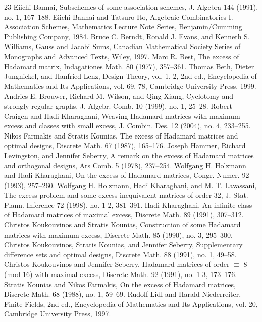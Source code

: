 \begin{thebibliography}{23}
 Eiichi Bannai, Subschemes of some association schemes, J. Algebra 144 (1991), no. 1, 167–188.
 Eiichi Bannai and Tatsuro Ito, Algebraic Combinatorics I. Association Schemes, Mathematics Lecture Note Series, Benjamin/Cumming Publishing Company, 1984.
 Bruce C. Berndt, Ronald J. Evans, and Kenneth S. Williams, Gauss and Jacobi Sums, Canadian Mathematical Society Series of Monographs and Advanced Texts, Wiley, 1997.
 Marc R. Best, The excess of Hadamard matrix, Indagationes Math. 80 (1977), 357–361.
 Thomas Beth, Dieter Jungnickel, and Hanfried Lenz, Design Theory, vol. 1, 2, 2nd ed., Encyclopedia of Mathematics and Its Applications, vol. 69, 78, Cambridge University Press, 1999.
 Andries E. Brouwer, Richard M. Wilson, and Qing Xiang, Cyclotomy and strongly regular graphs, J. Algebr. Comb. 10 (1999), no. 1, 25–28.
 Robert Craigen and Hadi Kharaghani, Weaving Hadamard matrices with maximum excess and classes with small excess, J. Combin. Des. 12 (2004), no. 4, 233–255.
 Nikos Farmakis and Stratis Kounias, The excess of Hadamard matrices and optimal designs, Discrete Math. 67 (1987), 165–176.
 Joseph Hammer, Richard Levingston, and Jennifer Seberry, A remark on the excess of Hadamard matrices and orthogonal designs, Ars Comb. 5 (1978), 237–254.
 Wolfgang H. Holzmann and Hadi Kharaghani, On the excess of Hadamard matrices, Congr. Numer. 92 (1993), 257–260.
 Wolfgang H. Holzmann, Hadi Kharaghani, and M. T. Lavassani, The excess problem and some excess inequivalent matrices of order 32, J. Stat. Plann. Inference 72 (1998), no. 1-2, 381–391.
 Hadi Kharaghani, An infinite class of Hadamard matrices of maximal excess, Discrete Math. 89 (1991), 307–312.
 Christos Koukouvinos and Stratis Kounias, Construction of some Hadamard matrices with maximum excess, Discrete Math. 85 (1990), no. 3, 295–300.
 Christos Koukouvinos, Stratis Kounias, and Jennifer Seberry, Supplementary difference sets and optimal designs, Discrete Math. 88 (1991), no. 1, 49–58.
 Christos Koukouvinos and Jennifer Seberry, Hadamard matrices of order $\equiv$ 8 (mod 16) with maximal excess, Discrete Math. 92 (1991), no. 1-3, 173–176.
 Stratis Kounias and Nikos Farmakis, On the excess of Hadamard matrices, Discrete Math. 68 (1988), no. 1, 59–69.
 Rudolf Lidl and Harald Niederreiter, Finite Fields, 2nd ed., Encyclopedia of Mathematics and Its Applications, vol. 20, Cambridge University Press, 1997.

\end{thebibliography}
